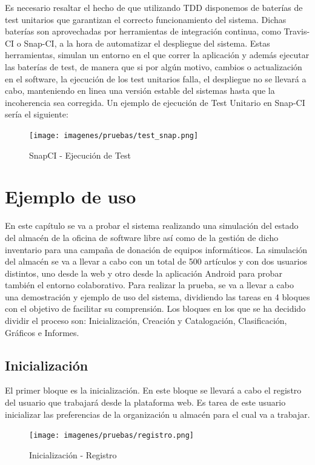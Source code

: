 \documentclass[a4paper,11pt]{book}
\begin{document}
Es necesario resaltar el hecho de que utilizando TDD disponemos de baterías de test unitarios que garantizan el correcto funcionamiento del sistema. Dichas baterías son aprovechadas por herramientas de integración continua,  como Travis-CI o Snap-CI, a la hora de automatizar el despliegue del sistema. Estas herramientas, simulan un entorno en el que correr la aplicación y además ejecutar las baterías de test, de manera que si por algún motivo, cambios o actualización en el software, la ejecución de los test unitarios falla, el despliegue no se llevará a cabo, manteniendo en linea una versión estable del sistemas hasta que la incoherencia sea corregida. Un ejemplo de ejecución de Test Unitario en Snap-CI sería el siguiente:

\begin{figure}[H] 
\centering 
\texttt{[image: imagenes/pruebas/test\_snap.png]}
\caption{ SnapCI - Ejecución de Test\cite{propio}}
\end{figure}


\section{Ejemplo de uso}
En este capítulo se va a probar el sistema realizando una simulación del estado del almacén de la oficina de software libre así como de la gestión de dicho inventario para una campaña de donación de equipos informáticos. La simulación del almacén se va a llevar a cabo con un total de 500 artículos y con dos usuarios distintos, uno desde la web y otro desde la aplicación Android para probar también el entorno colaborativo.   Para realizar la prueba, se va a llevar a cabo una demostración y ejemplo de uso del sistema, dividiendo las tareas en 4 bloques con el objetivo de facilitar su comprensión. Los bloques en los que se ha decidido dividir el proceso son: Inicialización, Creación y Catalogación, Clasificación, Gráficos e Informes. 

\subsection{Inicialización}
El primer bloque es la inicialización. En este bloque se llevará a cabo el registro del usuario que trabajará desde la plataforma web. Es tarea de este usuario inicializar las preferencias de la organización u almacén para el cual va a trabajar. 

\begin{figure}[H] 
\centering 
\texttt{[image: imagenes/pruebas/registro.png]}
\caption{ Inicialización - Registro\cite{propio}}
\end{figure}
\end{document}
